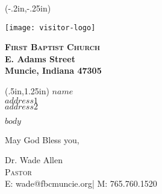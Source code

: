 \documentclass[10pt,letterpaper]{article}
\begin{document}
  
\thispagestyle{empty}

\begin{textblock*}{3in}(-.2in,-.25in)
  \begin{minipage}{.5in}
   \texttt{[image: visitor-logo]}
  \end{minipage}
  \begin{minipage}{1.5in}
  \noindent \bfseries \textsc{First Baptist Church} \\
   E. Adams Street \\
  Muncie, Indiana 47305 \\
  \end{minipage}
\end{textblock*}


\begin{textblock*}{3in}(.5in,1.25in)
 \noindent \bfseries \textsc{$name$} \\
 \normalfont $address1$ \\
 $address2$ \\

\end{textblock*}

\vspace{64mm}

\large

$body$

\vspace{10mm}
 
\noindent May God Bless you, 

\vspace{20mm}

Dr. Wade Allen \\ %
\textsc{Pastor} \\ %
\small{E: wade@fbcmuncie.org| M: 765.760.1520} %
 
\end{document}
